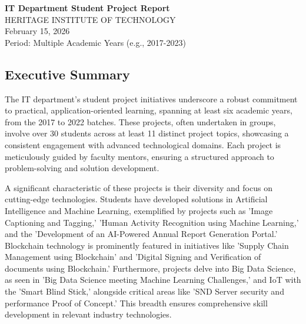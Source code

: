 \documentclass[11pt,a4paper]{article}
\newcommand{\InstituteName}{HERITAGE INSTITUTE OF TECHNOLOGY}
\newcommand{\ReportTitle}{IT Department Student Project Report}
\newcommand{\ReportDate}{February 15, 2026}
\newcommand{\ReportPeriod}{Multiple Academic Years (e.g., 2017-2023)}
\newenvironment{card}{
    \begin{tcolorbox}[
        enhanced,
        colback=cardback,
        colframe=border,
        sharp corners,
        boxrule=0.5pt,
        drop shadow,
        drop shadow={shadow xshift=1mm,shadow yshift=-1mm,fill=border!50},
        boxsep=3mm,
        left=5mm, right=5mm, top=5mm, bottom=5mm,
        width=\textwidth,
        nobeforeafter
    ]
}{\end{tcolorbox}}
\begin{document}
\thispagestyle{empty}
\vspace*{2cm}
\begin{center}
    {\Huge\textcolor{accent}{\textbf{\ReportTitle}}}\\
    \vspace{1cm}
    {\large\textcolor{muted}{\InstituteName}}\\
    {\large\textcolor{muted}{\ReportDate}}\\
    \vspace{0.5cm}
    {\small\textcolor{muted}{Period: \ReportPeriod}}
\end{center}

\vspace{2cm}

\begin{card}
    \subsection*{\textcolor{accent}{Executive Summary}}
    \vspace{0.3cm}
    The IT department's student project initiatives underscore a robust commitment to practical, application-oriented learning, spanning at least six academic years, from the 2017 to 2022 batches. These projects, often undertaken in groups, involve over 30 students across at least 11 distinct project topics, showcasing a consistent engagement with advanced technological domains. Each project is meticulously guided by faculty mentors, ensuring a structured approach to problem-solving and solution development.

    A significant characteristic of these projects is their diversity and focus on cutting-edge technologies. Students have developed solutions in Artificial Intelligence and Machine Learning, exemplified by projects such as 'Image Captioning and Tagging,' 'Human Activity Recognition using Machine Learning,' and the 'Development of an AI-Powered Annual Report Generation Portal.' Blockchain technology is prominently featured in initiatives like 'Supply Chain Management using Blockchain' and 'Digital Signing and Verification of documents using Blockchain.' Furthermore, projects delve into Big Data Science, as seen in 'Big Data Science meeting Machine Learning Challenges,' and IoT with the 'Smart Blind Stick,' alongside critical areas like 'SND Server security and performance Proof of Concept.' This breadth ensures comprehensive skill development in relevant industry technologies.


\end{card}
\end{document}
